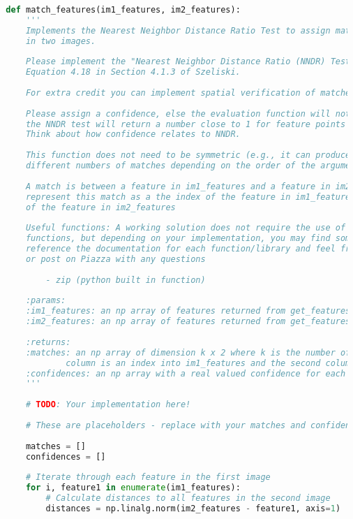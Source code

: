 \begin{lstlisting}[caption={student.py}, label={lst:code-example}, captionpos=t, language=python]
  
  def match_features(im1_features, im2_features):
      '''
      Implements the Nearest Neighbor Distance Ratio Test to assign matches between interest points
      in two images.
  
      Please implement the "Nearest Neighbor Distance Ratio (NNDR) Test" ,
      Equation 4.18 in Section 4.1.3 of Szeliski.
  
      For extra credit you can implement spatial verification of matches.
  
      Please assign a confidence, else the evaluation function will not work. Remember that
      the NNDR test will return a number close to 1 for feature points with similar distances.
      Think about how confidence relates to NNDR.
  
      This function does not need to be symmetric (e.g., it can produce
      different numbers of matches depending on the order of the arguments).
  
      A match is between a feature in im1_features and a feature in im2_features. We can
      represent this match as a the index of the feature in im1_features and the index
      of the feature in im2_features
  
      Useful functions: A working solution does not require the use of all of these
      functions, but depending on your implementation, you may find some useful. Please
      reference the documentation for each function/library and feel free to come to hours
      or post on Piazza with any questions
  
          - zip (python built in function)
  
      :params:
      :im1_features: an np array of features returned from get_features() for interest points in image1
      :im2_features: an np array of features returned from get_features() for interest points in image2
  
      :returns:
      :matches: an np array of dimension k x 2 where k is the number of matches. The first
              column is an index into im1_features and the second column is an index into im2_features
      :confidences: an np array with a real valued confidence for each match
      '''
  
      # TODO: Your implementation here!
  
      # These are placeholders - replace with your matches and confidences!
  
      matches = []
      confidences = []
  
      # Iterate through each feature in the first image
      for i, feature1 in enumerate(im1_features):
          # Calculate distances to all features in the second image
          distances = np.linalg.norm(im2_features - feature1, axis=1)
  

\end{lstlisting}
